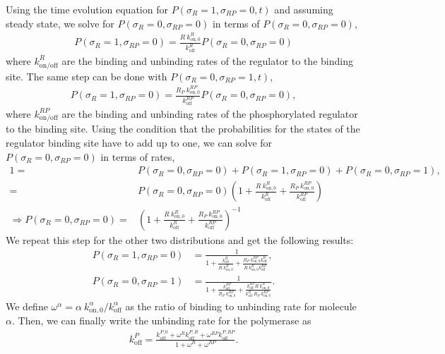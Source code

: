 \documentclass[11.5pt]{report} %
\begin{document}
Using the time evolution equation for $P(\sigma_R=1,\sigma_{RP}=0, t)$ and assuming steady state, we solve for $P(\sigma_R=0,\sigma_{RP}=0)$ in terms of $P(\sigma_R=0,\sigma_{RP}=0)$,
\begin{align}
    P(\sigma_R=1,\sigma_{RP}=0) = \frac{R\ k_{\mathrm{on}, 0}^R}{k_\mathrm{off}^R} P(\sigma_R=0,\sigma_{RP}=0)
\end{align}
where $k_\mathrm{on/off}^R$ are the binding and unbinding rates of the regulator to the binding site.
The same step can be done with $P(\sigma_R=0,\sigma_{RP}=1, t)$,
\begin{align}
    P(\sigma_R=1,\sigma_{RP}=0) = \frac{R_P\ k_{\mathrm{on}, 0}^{RP}}{k_\mathrm{off}^{RP}} P(\sigma_R=0,\sigma_{RP}=0),
\end{align}
where $k_\mathrm{on/off}^{RP}$ are the binding and unbinding rates of the phosphorylated regulator to the binding site.
Using the condition that the probabilities for the states of the regulator binding site have to add up to one, we can solve for $P(\sigma_R=0,\sigma_{RP}=0)$ in terms of rates,
\begin{align}
    1 =& P(\sigma_R=0,\sigma_{RP}=0) + P(\sigma_R=1,\sigma_{RP}=0) + P(\sigma_R=0,\sigma_{RP}=1),\nonumber\\
    =&P(\sigma_R=0,\sigma_{RP}=0)\left( 1 + \frac{R\ k_{\mathrm{on}, 0}^R}{k_\mathrm{off}^R} + \frac{R_P\ k_{\mathrm{on}, 0}^{RP}}{k_\mathrm{off}^{RP}} \right)\nonumber\\
    \Rightarrow P(\sigma_R=0,\sigma_{RP}=0) = & \left( 1 + \frac{R\ k_{\mathrm{on}, 0}^R}{k_\mathrm{off}^R} + \frac{R_P\ k_{\mathrm{on}, 0}^{RP}}{k_\mathrm{off}^{RP}} \right)^{-1}
\end{align}
We repeat this step for the other two distributions and get the following results:
\begin{align}
    P(\sigma_R=1,\sigma_{RP}=0) &= \frac{1}{1+\frac{k_\mathrm{off}^R}{R\ k_{\mathrm{on}, 0}^R} + \frac{R_P\ k_{\mathrm{on}, 0}^{RP}k_\mathrm{off}^{R}}{R\ k_{\mathrm{on}, 0}^R k_\mathrm{off}^{RP}}},\\
    P(\sigma_R=0,\sigma_{RP}=1) &= \frac{1}{1+\frac{k_\mathrm{off}^{RP}}{R_P\ k_{\mathrm{on}, 0}^{RP}} + \frac{k_\mathrm{off}^{RP}R\ k_{\mathrm{on}, 0}^R}{k_\mathrm{off}^R\ R_P\ k_{\mathrm{on}, 0}^{RP}}}.
\end{align}
We define $\omega^\alpha = \alpha\ k_\mathrm{on, 0}^\alpha/k_\mathrm{off}^\alpha$ as the ratio of binding to unbinding rate for molecule $\alpha$. Then, we can finally write the unbinding rate for the polymerase as 
\begin{align}
    k_\mathrm{off}^P = \frac{k_\mathrm{off}^{P,0}+ \omega^R k_\mathrm{off}^{P,R} + \omega^{RP}k_\mathrm{off}^{P,RP}}{1+\omega^R + \omega^{RP}}.
\end{align}
\end{document}
